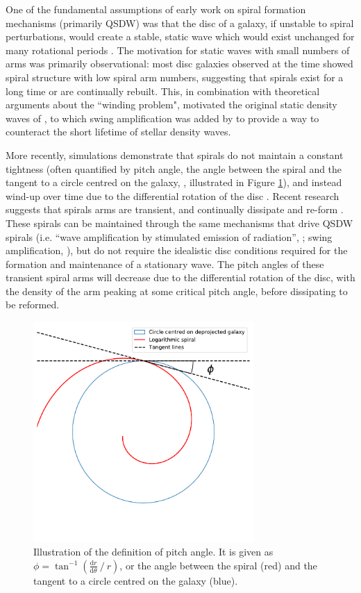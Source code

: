 One of the fundamental assumptions of early work on spiral formation mechanisms (primarily QSDW) was that the disc of a galaxy, if unstable to spiral perturbations, would create a stable, static wave which would exist unchanged for many rotational periods \citep{1964ApJ...140..646L}. The motivation for static waves with small numbers of arms was primarily observational: most disc galaxies observed at the time showed spiral structure with low spiral arm numbers, suggesting that spirals exist for a long time or are continually rebuilt. This, in combination with theoretical arguments about the ``winding problem", motivated the original static density waves of \citet{1964ApJ...140..646L}, to which swing amplification was added by \citet{Toomre1981}  to provide a way to counteract the short lifetime of stellar density waves.

More recently, simulations demonstrate that spirals do not maintain a constant tightness (often quantified by pitch angle, the angle between the spiral and the tangent to a circle centred on the galaxy, \citealt{1987gady.book.....B}, illustrated in Figure \ref{fig:pitch-angle-example}), and instead wind-up over time due to the differential rotation of the disc \citep{2013ApJ...763...46B}. Recent research suggests that spirals arms are transient, and continually dissipate and re-form \citep{2014PASA...31...35D}. These spirals can be maintained through the same mechanisms that drive QSDW spirals (i.e. ``wave amplification by stimulated emission of radiation'', \citealt{1976ApJ...205..363M}; swing amplification, \citealt{1965MNRAS.130..125G}), but do not require the idealistic disc conditions required for the formation and maintenance of a stationary wave. The pitch angles of these transient spiral arms will decrease due to the differential rotation of the disc, with the density of the arm peaking at some critical pitch angle, before dissipating to be reformed.

\begin{figure}
  \includegraphics[width=8.4cm]{plots/pitch-angle-explanation.pdf}
  \caption{Illustration of the definition of pitch angle. It is given as $\phi = \tan^{-1}\left(\frac{\mathrm{d}r}{\mathrm{d}\theta}\ /\ r\right)$, or the angle between the spiral (red) and the tangent to a circle centred on the galaxy (blue).}
  \label{fig:pitch-angle-example}
\end{figure}


